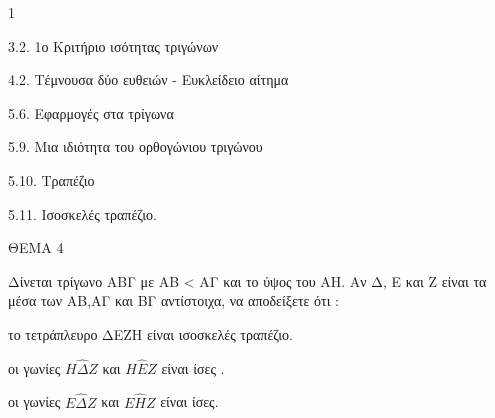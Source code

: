 \begin{ylh}{1}
    \item 3.2. 1ο Κριτήριο ισότητας τριγώνων
    \item 4.2. Τέμνουσα δύο ευθειών - Ευκλείδειο αίτημα
    \item 5.6. Εφαρμογές στα τρίγωνα
    \item 5.9. Μια ιδιότητα του ορθογώνιου τριγώνου
    \item 5.10. Τραπέζιο
    \item 5.11. Ισοσκελές τραπέζιο.
\end{ylh}

ΘΕΜΑ 4

Δίνεται τρίγωνο ΑΒΓ με ΑΒ \textless{} ΑΓ και το ύψος του ΑΗ. Αν Δ, Ε και Ζ είναι τα μέσα των ΑΒ,ΑΓ και ΒΓ αντίστοιχα, να αποδείξετε ότι :

\begin{alist}
\item το τετράπλευρο ΔΕΖΗ είναι ισοσκελές τραπέζιο. 

\item οι γωνίες $Η\widehat{\Delta}Ζ$ και $Η\widehat{Ε}Ζ$ είναι ίσες . 

\item οι γωνίες $Ε\widehat{\Delta}Ζ$ και $Ε\widehat{Η}Ζ$ είναι ίσες. 
\end{alist}
